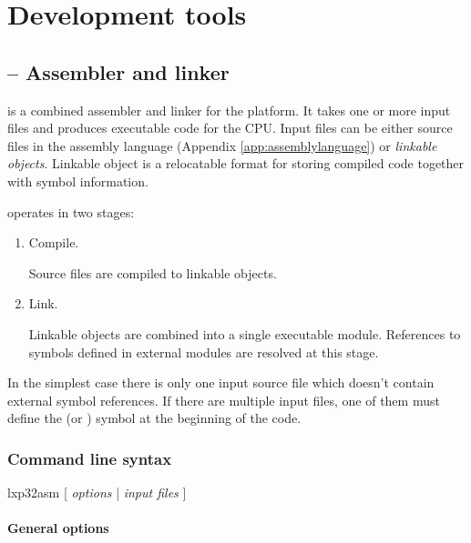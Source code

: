 \documentclass[a4paper,12pt,twoside,extrafontsizes]{memoir}
\begin{document}
\chapter{Development tools}
\label{ch:developmenttools}

\section{ -- Assembler and linker}
\label{sec:lxp32asm}

 is a combined assembler and linker for the \lxp{} platform. It takes one or more input files and produces executable code for the CPU. Input files can be either source files in the \lxp{} assembly language (Appendix \ref{app:assemblylanguage}) or \emph{linkable objects}. Linkable object is a relocatable format for storing compiled \lxp{} code together with symbol information.

 operates in two stages:

\begin{enumerate}
	\item Compile.
	
	Source files are compiled to linkable objects.
	
	\item Link.
	
	Linkable objects are combined into a single executable module. References to symbols defined in external modules are resolved at this stage.
\end{enumerate}

In the simplest case there is only one input source file which doesn't contain external symbol references. If there are multiple input files, one of them must define the  (or ) symbol at the beginning of the code.

\subsection{Command line syntax}
\label{subsec:assemblercmdline}

\begin{codepar}
    lxp32asm [ \emph{options} | \emph{input files} ]
\end{codepar}

\subsubsection{General options}
\end{document}
